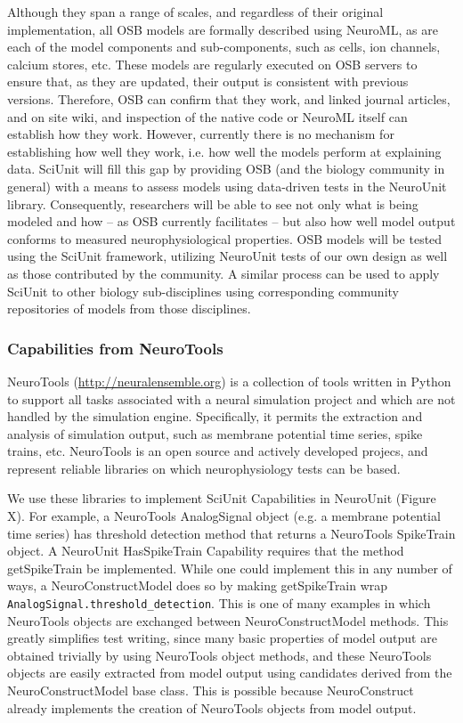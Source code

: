 \documentclass[11pt,letterpaper]{article}
\begin{document}
Although they span a range of scales, and regardless of their original implementation, all OSB models are formally described using NeuroML, as are each of the model components and sub-components, such as cells, ion channels, calcium stores, etc.  These models are regularly executed on OSB servers to ensure that, as they are updated, their output is consistent with previous versions.  Therefore, OSB can confirm that they work, and linked journal articles, and on site wiki, and inspection of the native code or NeuroML itself can establish how they work. However, currently there is no mechanism for establishing how well they work, i.e. how well the models perform at explaining data.  SciUnit will fill this gap by providing OSB (and the biology community in general) with a means to assess models using data-driven tests in the NeuroUnit library.  Consequently, researchers will be able to see not only what is being modeled and how -- as OSB currently facilitates -- but also how well model output conforms to measured neurophysiological properties. OSB models will be tested using the SciUnit framework, utilizing NeuroUnit tests of our own design as well as those contributed by the community.  A similar process can be used to apply SciUnit to other biology sub-disciplines using corresponding community repositories of models from those disciplines.

\subsubsection{Capabilities from NeuroTools}
NeuroTools (\url{http://neuralensemble.org}) is a collection of tools written in Python to support all tasks associated with a neural simulation project and which are not handled by the simulation engine.  Specifically, it permits the extraction and analysis of simulation output, such as membrane potential time series, spike trains, etc. NeuroTools is an open source and actively developed projecs, and represent reliable libraries on which neurophysiology tests can be based. 

We use these libraries to implement SciUnit Capabilities in NeuroUnit (Figure X).  For example, a NeuroTools AnalogSignal object (e.g. a membrane potential time series) has threshold detection method that returns a NeuroTools SpikeTrain object.  A NeuroUnit HasSpikeTrain Capability requires that the method getSpikeTrain be implemented.  While one could implement this in any number of ways, a NeuroConstructModel does so by making getSpikeTrain wrap \verb|AnalogSignal.threshold_detection|.  This is one of many examples in which NeuroTools objects are exchanged between NeuroConstructModel methods.  This greatly simplifies test writing, since many basic properties of model output are obtained trivially by using NeuroTools object methods, and these NeuroTools objects are easily extracted from model output using candidates derived from the NeuroConstructModel base class.  This is possible because NeuroConstruct already implements the creation of NeuroTools objects from model output.  
\end{document}
